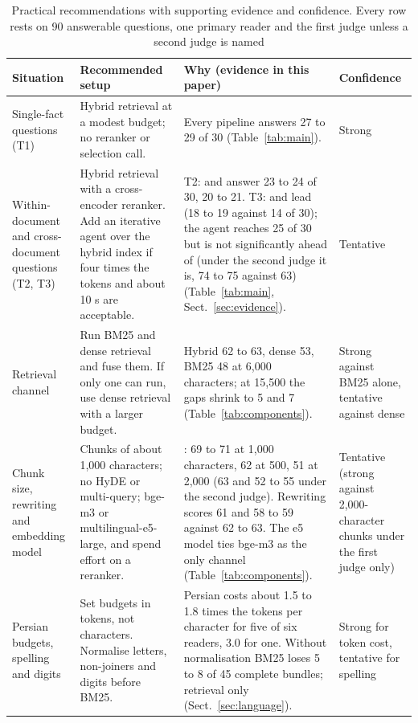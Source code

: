 \begin{table}[tp]
\caption{Practical recommendations with supporting evidence and confidence. Every row rests on 90 answerable questions, one primary reader and the first judge unless a second judge is named}
\label{tab:guide}
\centering
\footnotesize
\setlength{\tabcolsep}{3pt}
\renewcommand{\arraystretch}{1.02}
\begin{tabularx}{\textwidth}{@{}>{\raggedright\arraybackslash}p{2.3cm}>{\raggedright\arraybackslash}p{3.4cm}>{\raggedright\arraybackslash}X>{\raggedright\arraybackslash}p{2.2cm}@{}}
\toprule
Situation & Recommended setup & Why (evidence in this paper) & Confidence \\
\midrule
Single-fact questions (T1) & Hybrid retrieval at a modest budget; no reranker or selection call. & Every pipeline answers 27 to 29 of 30 (Table~\ref{tab:main}). & Strong \\
Within-document and cross-document questions (T2, T3) & Hybrid retrieval with a cross-encoder reranker. Add an iterative agent over the hybrid index if four times the tokens and about 10 s are acceptable. & T2: \hr{} and \lexb{} answer 23 to 24 of 30, \hybrid{} 20 to 21. T3: \hr{} and \setr{} lead \hybrid{} (18 to 19 against 14 of 30); the agent reaches 25 of 30 but is not significantly ahead of \hr{} (under the second judge it is, 74 to 75 against 63) (Table~\ref{tab:main}, Sect.~\ref{sec:evidence}). & Tentative \\
Retrieval channel & Run BM25 and dense retrieval and fuse them. If only one can run, use dense retrieval with a larger budget. & Hybrid 62 to 63, dense 53, BM25 48 at 6,000 characters; at 15,500 the gaps shrink to 5 and 7 (Table~\ref{tab:components}). & Strong against BM25 alone, tentative against dense \\
Chunk size, rewriting and embedding model & Chunks of about 1,000 characters; no HyDE or multi-query; bge-m3 or multilingual-e5-large, and spend effort on a reranker. & \hr{}: 69 to 71 at 1,000 characters, 62 at 500, 51 at 2,000 (63 and 52 to 55 under the second judge). Rewriting scores 61 and 58 to 59 against 62 to 63. The e5 model ties bge-m3 as the only channel (Table~\ref{tab:components}). & Tentative (strong against 2,000-character chunks under the first judge only) \\
Persian budgets, spelling and digits & Set budgets in tokens, not characters. Normalise letters, non-joiners and digits before BM25. & Persian costs about 1.5 to 1.8 times the tokens per character for five of six readers, 3.0 for one. Without normalisation BM25 loses 5 to 8 of 45 complete bundles; retrieval only (Sect.~\ref{sec:language}). & Strong for token cost, tentative for spelling \\
\bottomrule
\end{tabularx}
\end{table}

